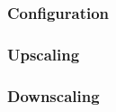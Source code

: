 \subsubsection{Configuration}
\label{subsubsec:implementation_autoscaling_cluster_autoscaler_configuration}


\subsubsection{Upscaling}
\label{subsubsec:implementation_autoscaling_cluster_autoscaler_upscaling}

\subsubsection{Downscaling}
\label{subsubsec:implementation_autoscaling_cluster_autoscaler_downscaling}
